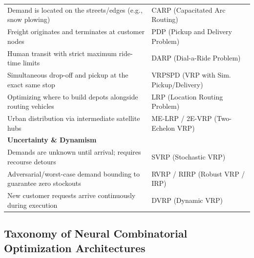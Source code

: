 \documentclass{article}
\begin{document}
\begin{table}[H]
\begin{tabularx}{\textwidth}{@{} X l @{}}
        Demand is located on the streets/edges (e.g., snow plowing) & CARP (Capacitated Arc Routing) \\
        Freight originates and terminates at customer nodes & PDP (Pickup and Delivery Problem) \\
        Human transit with strict maximum ride-time limits & DARP (Dial-a-Ride Problem) \\
        Simultaneous drop-off and pickup at the exact same stop & VRPSPD (VRP with Sim. Pickup/Delivery) \\
        Optimizing where to build depots alongside routing vehicles & LRP (Location Routing Problem) \\
        Urban distribution via intermediate satellite hubs & ME-LRP / 2E-VRP (Two-Echelon VRP) \\
        \midrule
        \textbf{Uncertainty \& Dynamism} \\
        Demands are unknown until arrival; requires recourse detours & SVRP (Stochastic VRP) \\
        Adversarial/worst-case demand bounding to guarantee zero stockouts & RVRP / RIRP (Robust VRP / IRP) \\
        New customer requests arrive continuously during execution & DVRP (Dynamic VRP) \\
        \bottomrule
    \end{tabularx}
\end{table}


\subsection*{Taxonomy of Neural Combinatorial Optimization Architectures}
\end{document}
